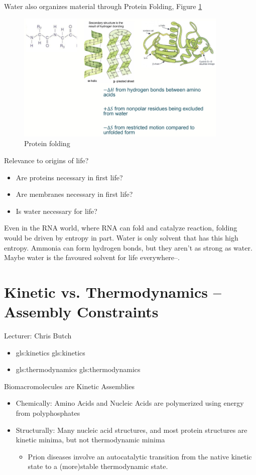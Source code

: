 \documentclass[]{article}
\begin{document}
Water also organizes material through Protein Folding, Figure \ref{fig:ProteinFolding} 
\begin{figure}[H]
	\caption{Protein folding} \label{fig:ProteinFolding} 
	\includegraphics[width=0.9\textwidth]{ProteinFolding}
\end{figure}

 Relevance to origins of life?
\begin{itemize}
	\item Are proteins necessary in first life?
	\item Are membranes necessary in first life?
	\item Is water necessary for life?
\end{itemize}

Even in the RNA world, where RNA can fold and catalyze reaction, folding would be driven by entropy in part. Water is only solvent that has this high entropy. Ammonia can form hydrogen bonds, but they aren't as strong as water. Maybe water is the favoured solvent for life everywhere--\cite{ball2017water}.

\section{Kinetic vs. Thermodynamics – Assembly Constraints}

Lecturer: Chris Butch

\begin{itemize}
	\item \gls{gls:kinetics}  \glsdesc{gls:kinetics}
	\item \gls{gls:thermodynamics} \glsdesc{gls:thermodynamics}
\end{itemize}

Biomacromolecules are Kinetic Assemblies
\begin{itemize}
	\item Chemically: Amino Acids and Nucleic Acids are polymerized using energy from polyphosphates
	\item Structurally: Many nucleic acid structures, and most 	protein structures are kinetic minima, but not thermodynamic minima
	\begin{itemize}
		\item  Prion diseases involve an autocatalytic transition from the native kinetic state to a (more)stable thermodynamic state.
	\end{itemize}
\end{itemize}
\end{document}
